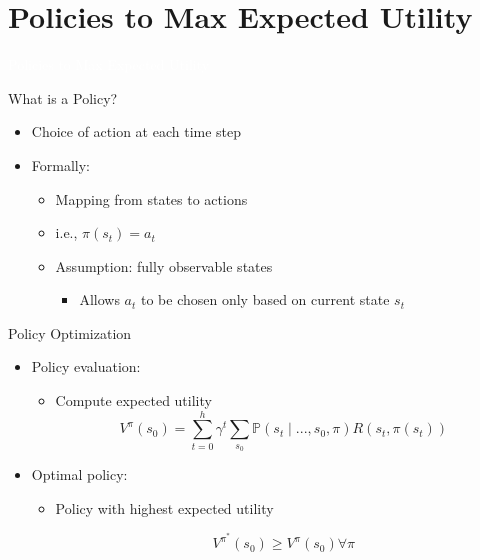 \documentclass[11pt,table]{beamer}
\begin{document}
\section{Policies to Max Expected Utility}
{
\begin{frame}
\centering
\Huge
\textcolor{white}{Policies to Max Expected Utility}
\thispagestyle{empty}
\end{frame}
}

\begin{frame}{What is a Policy?}

\begin{itemize}
    \item Choice of action at each time step

\item Formally:
\begin{itemize}
    \item Mapping from states to actions
\item i.e., $\pi(s_t)=a_t$
\item Assumption: \textcolor{red1}{fully observable states}
 \begin{itemize}
     \item Allows $a_t$ to be chosen only based on current state $s_t$
 \end{itemize}
\end{itemize}
 
\end{itemize}
    
\end{frame}



\begin{frame}{Policy Optimization}

\begin{itemize}
    \item Policy evaluation:
\begin{itemize}
     
 \item Compute expected utility
$$
V^{\pi}\left(s_{0}\right)=\sum_{t=0}^{h} \gamma^{t} \sum_{s_{0}} \mathbb{P}\left(s_{t} \mid ..., s_{0}, \pi\right) R\left(s_{t}, \pi\left(s_{t}\right)\right)
$$
\end{itemize}
\item Optimal policy:

\begin{itemize}
    \item Policy with highest expected utility

$$
V^{\pi^{*}}\left(s_{0}\right) \geq V^{\pi}\left(s_{0}\right) \forall \pi
$$ 
\end{itemize}
\end{itemize}
    
\end{frame}
\end{document}
